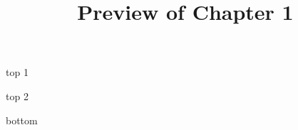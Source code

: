 \documentclass{ximera}
\title{Preview of Chapter 1}
\begin{document}
\begin{abstract}
\end{abstract}

\maketitle



top 1



\begin{center}
\end{center}


top 2

\begin{expandable}

\begin{center}
\end{center}

\end{expandable}






bottom
\end{document}
